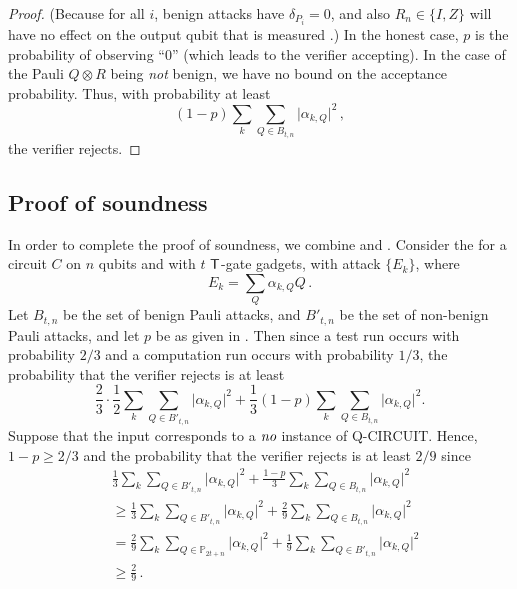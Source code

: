 \documentclass{toc}
\newcommand{\tgate}{{\sf T}}
\providecommand{\abs}[1]{\lvert#1\rvert}
\begin{document}
\begin{proof}
 (Because 
 for all $i$, benign attacks have $\delta_{P_i}=0$, and also $R_n \in \{I, Z\}$ will have no effect on the output qubit that is measured%
 .)
   In the honest case, $p$ is the probability of observing ``0'' (which leads to the verifier accepting). In the case of the Pauli $Q\otimes R$ being \emph{not} benign, we have no bound on the acceptance probability. Thus, with probability at least
\begin{equation}
  (1-p) \sum_k \sum_{Q \in  B_{t,n}} \abs{\alpha_{k, Q}}^2\,,
\end{equation}
the verifier rejects.
\end{proof}


\subsection{Proof of soundness}
\label{sec:soundness-proof}
In order to complete the proof of soundness, we combine  and .
Consider the  for a circuit $C$ on $n$ qubits and with $t$ $\tgate$-gate gadgets, with attack $\{E_k\}$, where
\begin{equation}
  E_k = \sum_Q \alpha_{k,Q} Q\,.
\end{equation}
Let $B_{t,n}$ be the set of benign Pauli attacks, and $B'_{t,n}$ be
the set of non-benign Pauli attacks, and let $p$ be as given in
. Then since a test run
occurs with probability ${2}/{3}$ and a computation run occurs
with probability ${1}/{3}$, the probability that the verifier
rejects is at least%
   \begin{equation}
   \frac{2}{3} \cdot \frac{1}{2}\sum_k\sum_{Q \in B'_{t,n}} \abs{\alpha_{k,Q}}^2 + \frac{1}{3} (1-p) \sum_k\sum_{Q \in B_{t,n}} \abs{\alpha_{k,Q}}^2.
   \end{equation}
 Suppose that the input corresponds to a $\emph{no}$ instance of \textsf{Q-CIRCUIT}. Hence, $1-p \geq {2}/{3}$ and the probability that the verifier rejects is at least ${2}/{9}$ since%
 \begin{align}
 &  \frac{1}{3} \sum_k \sum_{Q \in B'_{t,n}} \abs{\alpha_{k,Q}}^2 + \frac{1-p}{3}  \sum_k\sum_{Q \in B_{t,n}} \abs{\alpha_{k,Q}}^2 \label{Eqn:rej-prob} \\ &\geq
  \frac{1}{3} \sum_k \sum_{Q \in B'_{t,n}} \abs{\alpha_{k,Q}}^2 + \frac{2}{9}  \sum_k\sum_{Q \in B_{t,n}} \abs{\alpha_{k,Q}}^2 \\
&= \frac{2}{9}   \sum_k \sum_{Q\in \mathbb{P}_{2t+n}} \abs{\alpha_{k,Q}}^2 +  \frac{1}{9} \sum_k \sum_{Q \in B'_{t,n}} \abs{\alpha_{k,Q}}^2 \\
& \geq
 \frac{2}{9}\,.
  \end{align}
\end{document}
